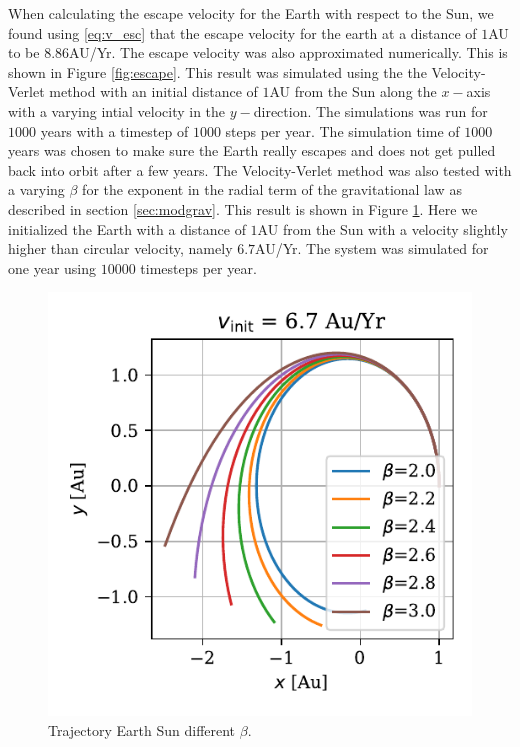 \documentclass[twocolumn]{aastex62}
\begin{document}
When calculating the escape velocity for the Earth with respect to the Sun, we
found using \ref{eq:v_esc} that the escape velocity for the earth at a distance
of $1$AU to be $8.86$AU/Yr. The escape velocity was also approximated
numerically. This is shown in Figure \ref{fig:escape}. This result was simulated
using the the Velocity-Verlet method with an initial distance of $1$AU from the
Sun along the $x-$axis with a varying intial velocity in the $y-$direction. The
simulations was run for $1000$ years with a timestep of $1000$ steps per year.
The simulation time of $1000$ years was chosen to make sure the Earth really
escapes and does not get pulled back into orbit after a few years. The
Velocity-Verlet method was also tested with a varying $\beta$ for the exponent
in the radial term of the gravitational law as described in section
\ref{sec:modgrav}. This result is shown in Figure \ref{fig:beta}. Here we
initialized the Earth with a distance of $1$AU from the Sun with a velocity
slightly higher than circular velocity, namely $6.7$AU/Yr. The system was
simulated for one year using $10000$ timesteps per year.



\begin{figure}
\includegraphics[scale=1]{Figures/beta.pdf}
\caption{Trajectory Earth Sun different $\beta$.}
\label{fig:beta}
\end{figure}
\end{document}
